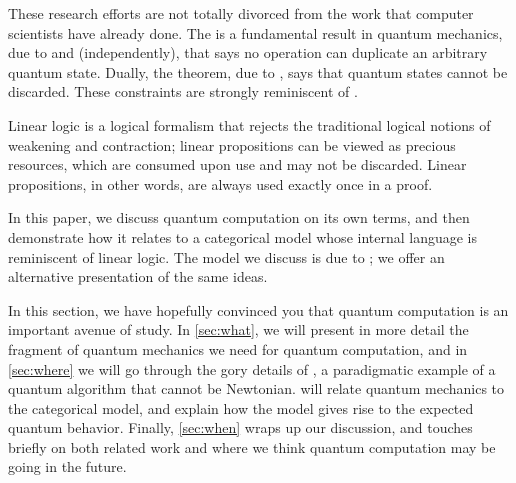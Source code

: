 These research efforts are not totally divorced from the work that computer
scientists have already done.  The  is a fundamental
result in quantum mechanics, due to \citet{wootters1982single} and
\citet{dieks1982communication} (independently), that says no operation can
duplicate an arbitrary quantum state.  Dually, the  theorem,
due to \citet{pati2000impossibility}, says that quantum states cannot be discarded.  These
constraints are strongly reminiscent of .

Linear logic is a logical formalism that rejects the traditional logical
notions of weakening and contraction; linear propositions can be viewed as
precious resources, which are consumed upon use and may not be discarded.
Linear propositions, in other words, are always used exactly once in a proof.

In this paper, we discuss quantum computation on its own terms, and then
demonstrate how it relates to a categorical model whose internal language is
reminiscent of linear logic.  The model we discuss is due to \citet{abramsky2009categorical};
we offer an alternative presentation of the same ideas.

In this section, we have hopefully convinced you that quantum computation is an
important avenue of study.  In \cref{sec:what}, we will present in more detail
the fragment of quantum mechanics we need for quantum computation, and in
\cref{sec:where} we will go through the gory details of , a paradigmatic example of a quantum algorithm that cannot be
Newtonian.   will relate quantum mechanics to the categorical model,
and explain how the model gives rise to the expected quantum behavior.  Finally,
\cref{sec:when} wraps up our discussion, and touches briefly on both related
work and where we think quantum computation may be going in the future.

